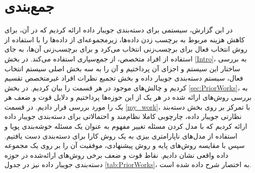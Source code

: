\section{جمع‌بندی}\label{conclusion}
در این گزارش، سیستمی برای دسته‌بندی جویبار داده ارائه کردیم که در آن، برای کاهش هزینه مربوط به برچسب زدن داده‌ها، زیرمجموعه‌ای از داده‌ها را با استفاده از روش انتخاب فعال برای برچسب‌زنی انتخاب می‌کرد و برای برچسب‌زنی آن‌ها، به جای استفاده از افراد متخصص، از جمع‌سپاری استفاده می‌کند. در بخش \ref{Intro}، به بررسی ساختار این سیستم و اجزای آن پرداختیم و آن را به سه بخش اصلی سیستم انتخاب فعال، سیستم دسته‌بندی جویبار داده و بخش تجمیع نظرات افراد غیرمتخصص تقسیم کردیم و چالش‌های موجود در هر قسمت را بیان کردیم. در بخش \ref{sec:PriorWorks}، به بررسی روش‌های ارائه شده در هر یک از این حوزه‌ها پرداختیم و دلایل قوت و ضعف هر یک را مورد بررسی قرار دادیم. در قسمت \ref{my_work}، با تمرکز بر روی بخش دسته‌بند نظارتی جویبار داده، چارچوبی کاملا نظام‌مند و احتمالاتی برای دسته‌بندی جویبار داده ارائه کردیم که با مدل کردن مسئله تغییر مفهوم به عنوان یک مسئله خوشه‌بندی پویا و استفاده از مدل‌های ناپارامتری بیزی به یک روش کارا برای دسته‌بندی دست یافتیم. سپس با مقایسه روش‌های پایه و روش پیشنهادی، موفقیت آن را بر روی یک مجموعه داده واقعی نشان دادیم. نقاط قوت و ضعف برخی روش‌های ارائه‌شده در حوزه دسته‌بندی جویبار داده نیز در جدول \ref{tab:PriorWorks}، به اختصار شرح داده شده است.

